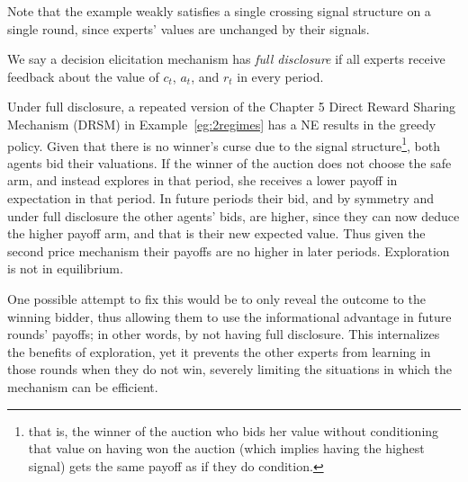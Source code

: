 Note that the example weakly satisfies a single crossing signal structure on a single round, since experts' values are unchanged by their signals.

\begin{defn}
  We say a decision elicitation mechanism has \emph{full disclosure} if all experts receive feedback about the value of $c_t$, $a_t$, and $r_t$ in every period.
 \end{defn}


Under full disclosure, a repeated version of the Chapter 5 Direct Reward Sharing Mechanism (DRSM) in Example~\ref{eg:2regimes} has a NE results in the greedy policy. %
Given that there is no winner's curse due to the signal structure\footnote{that is, the winner of the auction who  bids her value without conditioning that value on having won the auction (which implies having the highest signal) gets the same payoff as if they do condition.}, both agents bid their valuations. %
If the winner of the auction does not choose the safe arm, and instead explores in that period, she receives a lower payoff in expectation in that period. In future periods their bid, and by symmetry and under full disclosure the other agents' bids, are higher, since they can now deduce the higher payoff arm, and that is their new expected value. Thus given the second price mechanism their payoffs are no higher in later periods. Exploration is not in equilibrium. 


One possible attempt to fix this would be to only reveal the outcome to the winning bidder, thus allowing them to use the informational advantage in future rounds' payoffs; in other words, by not having full disclosure.
This internalizes the benefits of exploration, yet it prevents the other experts from learning in those rounds when they do not win, severely limiting the situations in which the mechanism can be efficient.




